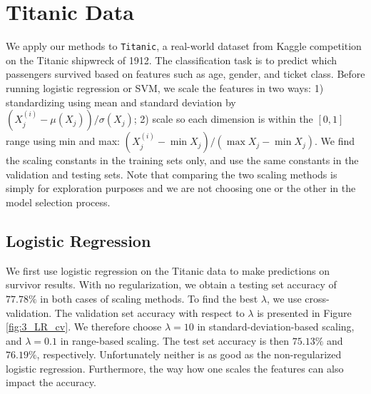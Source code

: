 
\section{Titanic Data}\label{sec:titanic}
We apply our methods to \texttt{Titanic}, a real-world dataset from Kaggle competition on the Titanic shipwreck of 1912.  The classification task is to predict which passengers survived based on features such as age, gender, and ticket class.  Before running logistic regression or SVM, we scale the features in two ways: 1) standardizing using mean and standard deviation by $(X_{j}^{(i)} - \mu(X_{j}))/\sigma(X_{j})$; 2) scale so each dimension is within the $[0, 1]$ range using min and max: $(X_{j}^{(i)} - \min{X_j})/(\max{X_j} - \min{X_j})$. We find the scaling constants in the training sets only, and use the same constants in the validation and testing sets. Note that comparing the two scaling methods is simply for exploration purposes and we are not choosing one or the other in the model selection process.


\subsection{Logistic Regression}
We first use logistic regression on the Titanic data to make predictions on survivor results. With no regularization, we obtain a testing set accuracy of $77.78\%$ in both cases of scaling methods. To find the best $\lambda$, we use cross-validation. The validation set accuracy with respect to $\lambda$ is presented in Figure \ref{fig:3_LR_cv}. We therefore choose $\lambda = 10$ in standard-deviation-based scaling, and $\lambda = 0.1$ in range-based scaling. The test set accuracy is then $75.13\%$ and $76.19\%$, respectively. Unfortunately neither is as good as the non-regularized logistic regression. Furthermore, the way how one scales the features can also impact the accuracy.

